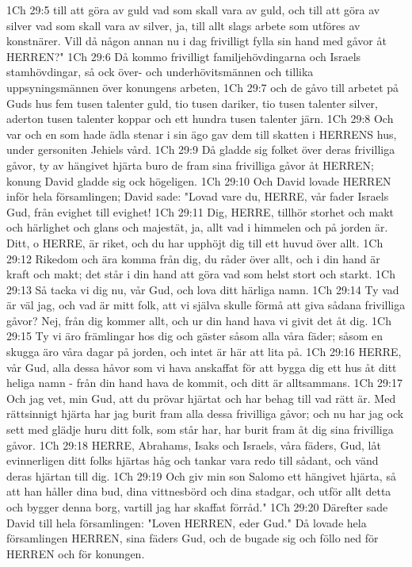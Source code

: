 1Ch 29:5  till att göra av guld vad som skall vara av guld, och till att göra av silver vad som skall vara av silver, ja, till allt slags arbete som utföres av konstnärer. Vill då någon annan nu i dag frivilligt fylla sin hand med gåvor åt HERREN?"
1Ch 29:6  Då kommo frivilligt familjehövdingarna och Israels stamhövdingar, så ock över- och underhövitsmännen och tillika uppsyningsmännen över konungens arbeten,
1Ch 29:7  och de gåvo till arbetet på Guds hus fem tusen talenter guld, tio tusen dariker, tio tusen talenter silver, aderton tusen talenter koppar och ett hundra tusen talenter järn.
1Ch 29:8  Och var och en som hade ädla stenar i sin ägo gav dem till skatten i HERRENS hus, under gersoniten Jehiels vård.
1Ch 29:9  Då gladde sig folket över deras frivilliga gåvor, ty av hängivet hjärta buro de fram sina frivilliga gåvor åt HERREN; konung David gladde sig ock högeligen.
1Ch 29:10  Och David lovade HERREN inför hela församlingen; David sade: "Lovad vare du, HERRE, vår fader Israels Gud, från evighet till evighet!
1Ch 29:11  Dig, HERRE, tillhör storhet och makt och härlighet och glans och majestät, ja, allt vad i himmelen och på jorden är. Ditt, o HERRE, är riket, och du har upphöjt dig till ett huvud över allt.
1Ch 29:12  Rikedom och ära komma från dig, du råder över allt, och i din hand är kraft och makt; det står i din hand att göra vad som helst stort och starkt.
1Ch 29:13  Så tacka vi dig nu, vår Gud, och lova ditt härliga namn.
1Ch 29:14  Ty vad är väl jag, och vad är mitt folk, att vi själva skulle förmå att giva sådana frivilliga gåvor? Nej, från dig kommer allt, och ur din hand hava vi givit det åt dig.
1Ch 29:15  Ty vi äro främlingar hos dig och gäster såsom alla våra fäder; såsom en skugga äro våra dagar på jorden, och intet är här att lita på.
1Ch 29:16  HERRE, vår Gud, alla dessa håvor som vi hava anskaffat för att bygga dig ett hus åt ditt heliga namn - från din hand hava de kommit, och ditt är alltsammans.
1Ch 29:17  Och jag vet, min Gud, att du prövar hjärtat och har behag till vad rätt är. Med rättsinnigt hjärta har jag burit fram alla dessa frivilliga gåvor; och nu har jag ock sett med glädje huru ditt folk, som står har, har burit fram åt dig sina frivilliga gåvor.
1Ch 29:18  HERRE, Abrahams, Isaks och Israels, våra fäders, Gud, låt evinnerligen ditt folks hjärtas håg och tankar vara redo till sådant, och vänd deras hjärtan till dig.
1Ch 29:19  Och giv min son Salomo ett hängivet hjärta, så att han håller dina bud, dina vittnesbörd och dina stadgar, och utför allt detta och bygger denna borg, vartill jag har skaffat förråd."
1Ch 29:20  Därefter sade David till hela församlingen: "Loven HERREN, eder Gud." Då lovade hela församlingen HERREN, sina fäders Gud, och de bugade sig och föllo ned för HERREN och för konungen.
